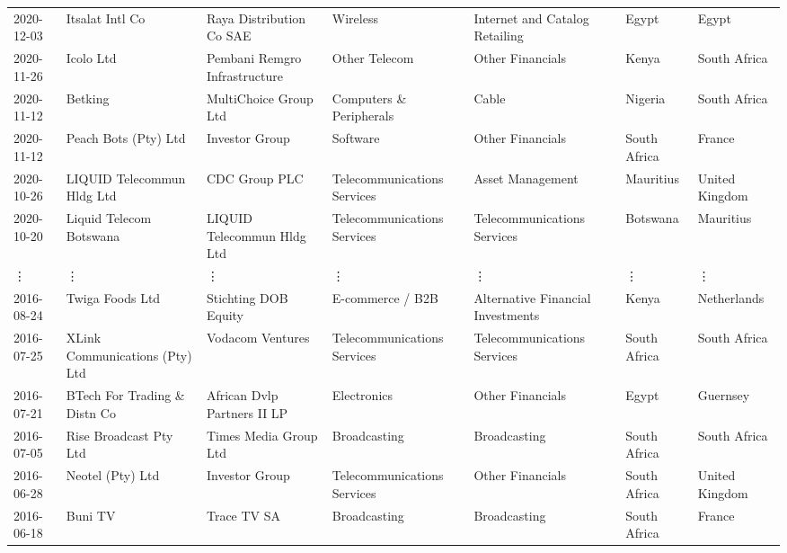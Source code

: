 \documentclass[11pt]{article}
\begin{document}
\begin{tabular}{lllllll}
	 2020-12-03 & Itsalat Intl Co             & Raya Distribution Co SAE      & Wireless                     & Internet and Catalog Retailing    & Egypt        & Egypt         \\
	 2020-11-26 & Icolo Ltd                   & Pembani Remgro Infrastructure & Other Telecom                & Other Financials                  & Kenya        & South Africa  \\
	 2020-11-12 & Betking                     & MultiChoice Group Ltd         & Computers \& Peripherals      & Cable                             & Nigeria      & South Africa  \\
	 2020-11-12 & Peach Bots (Pty) Ltd        & Investor Group                & Software                     & Other Financials                  & South Africa & France        \\
	 2020-10-26 & LIQUID Telecommun Hldg Ltd  & CDC Group PLC                 & Telecommunications Services  & Asset Management                  & Mauritius    & United Kingdom\\
	 2020-10-20 & Liquid Telecom Botswana     & LIQUID Telecommun Hldg Ltd    & Telecommunications Services  & Telecommunications Services       & Botswana     & Mauritius     \\
	 ⋮ & ⋮ & ⋮ & ⋮ & ⋮ & ⋮ & ⋮\\
	 2016-08-24 & Twiga Foods Ltd                & Stichting DOB Equity           & E-commerce / B2B               & Alternative Financial Investments & Kenya         & Netherlands   \\
	 2016-07-25 & XLink Communications (Pty) Ltd & Vodacom Ventures               & Telecommunications Services    & Telecommunications Services       & South Africa  & South Africa  \\
	 2016-07-21 & BTech For Trading \& Distn Co   & African Dvlp Partners II LP    & Electronics                    & Other Financials                  & Egypt         & Guernsey      \\
	 2016-07-05 & Rise Broadcast Pty Ltd         & Times Media Group Ltd          & Broadcasting                   & Broadcasting                      & South Africa  & South Africa  \\
	 2016-06-28 & Neotel (Pty) Ltd               & Investor Group                 & Telecommunications Services    & Other Financials                  & South Africa  & United Kingdom\\
	 2016-06-18 & Buni TV                        & Trace TV SA                    & Broadcasting                   & Broadcasting                      & South Africa  & France        \\

\end{tabular}
\end{document}
